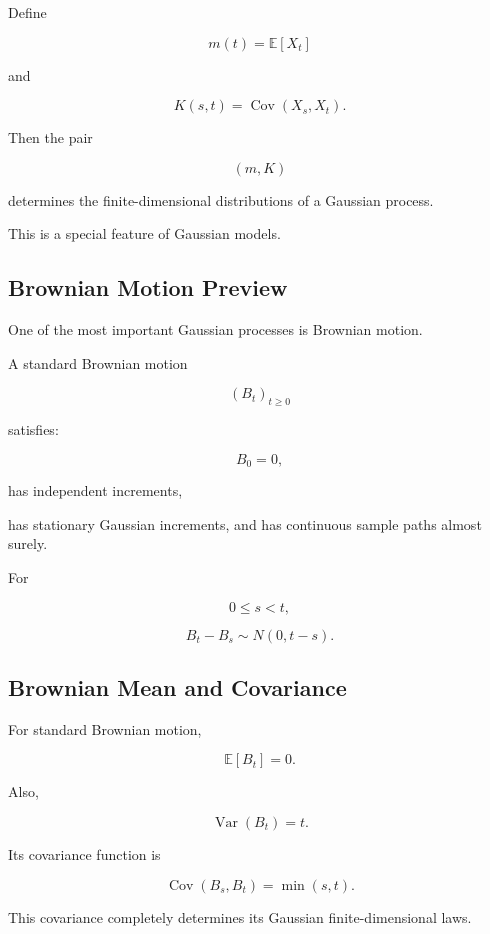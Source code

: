 Define

\[
m(t)
=
\mathbb{E}[X_t]
\]

and

\[
K(s,t)
=
\operatorname{Cov}(X_s,X_t).
\]

Then the pair

\[
\boxed{
(m,K)
}
\]

determines the finite-dimensional distributions of a Gaussian process.

This is a special feature of Gaussian models.

\subsection{Brownian Motion Preview}
\label{subsec:brownian-motion-preview}

One of the most important Gaussian processes is Brownian motion.

A standard Brownian motion

\[
(B_t)_{t\geq0}
\]

satisfies:

\[
\boxed{
B_0=0,
}
\]

has independent increments,

has stationary Gaussian increments, and has continuous sample paths
almost surely.

For

\[
0\leq s<t,
\]

\[
\boxed{
B_t-B_s
\sim
N(0,t-s).
}
\]

\subsection{Brownian Mean and Covariance}
\label{subsec:brownian-mean-covariance}

For standard Brownian motion,

\[
\boxed{
\mathbb{E}[B_t]=0.
}
\]

Also,

\[
\boxed{
\operatorname{Var}(B_t)=t.
}
\]

Its covariance function is

\[
\boxed{
\operatorname{Cov}(B_s,B_t)
=
\min(s,t).
}
\]

This covariance completely determines its Gaussian finite-dimensional
laws.

